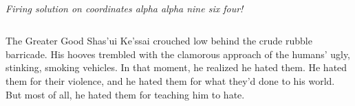 \documentclass{40k}
\begin{document}
\begin{columns}
\vfill
\noindent%
\begin{minipage}[h]{1.0\linewidth}\centering\small\it%
\\
Firing solution on coordinates alpha alpha nine six four!
\end{minipage}

\end{columns}

\vfill
\begin{story}{0.35in}{The Greater Good}
  Shas'ui Ke'ssai crouched low behind the crude rubble barricade.  His
  hooves trembled with the clamorous approach of the humans' ugly,
  stinking, smoking vehicles.  In that moment, he realized he hated
  them.  He hated them for their violence, and he hated them for what
  they'd done to his world.  But most of all, he hated them for
  teaching him to hate.
\end{story}
\end{document}
